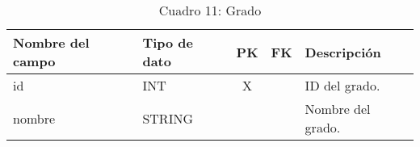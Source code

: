 \begin{table}[H]
	\centering
	\begin{tabular}{|l|l|c|c|l|}
		\hline
		\textbf{Nombre del campo} & \textbf{Tipo de dato} & \textbf{PK} & \textbf{FK} & \textbf{Descripción} \\
		\hline
		id                        & INT                   & X           &             & ID del grado.        \\
		\hline
		nombre                    & STRING                &             &             & Nombre del grado.    \\
		\hline
	\end{tabular}
	\caption{Cuadro 11: Grado}
\end{table}